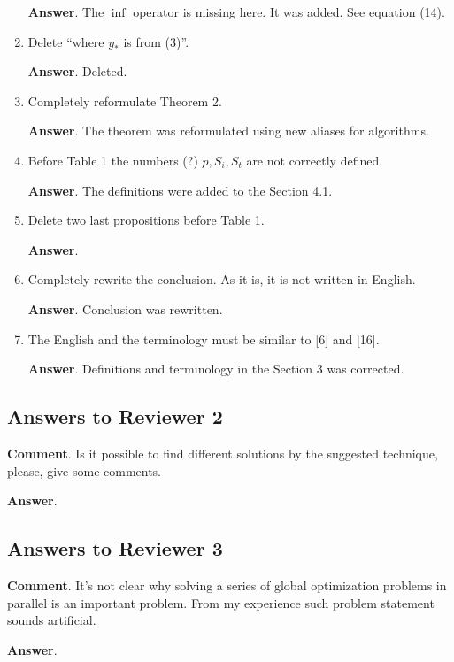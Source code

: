 \documentclass{article}%
\begin{document}
\begin{enumerate}
\textbf{Answer}.
The $\inf$ operator is missing here. It was added. See equation (14).

\item  Delete “where $y_*$ is from (3)”.

\textbf{Answer}.
Deleted.

\item  Completely reformulate Theorem 2.

\textbf{Answer}.
The theorem was reformulated using new aliases for algorithms.

\item  Before Table 1 the numbers (?) $p, S_i, S_t$ are not correctly defined.

\textbf{Answer}.
The definitions were added to the Section 4.1.

\item  Delete two last propositions before Table 1.

\textbf{Answer}.

\item  Completely rewrite the conclusion. As it is, it is not written in English.

\textbf{Answer}.
Conclusion was rewritten.

\item  The English and the terminology must be similar to [6] and [16].

\textbf{Answer}.
Definitions and terminology in the Section 3 was corrected.

\end{enumerate}



\subsection*{Answers to Reviewer 2}

\textbf{Comment}. Is it possible to find different solutions by the suggested technique, please, give some comments.

\textbf{Answer}.


\subsection*{Answers to Reviewer 3}

\textbf{Comment}. It's not clear why solving a series of global optimization problems in parallel is an important problem. From my experience such problem statement sounds artificial.

\textbf{Answer}.
\end{document}
